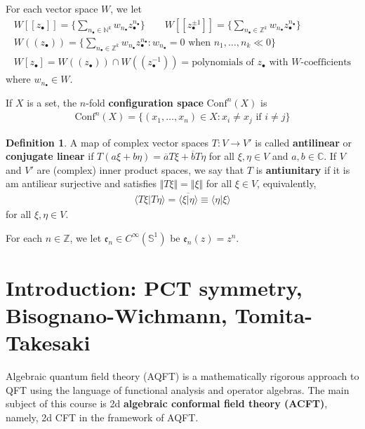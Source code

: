 \documentclass[12pt,b5paper,notitlepage]{article}
\theoremstyle{definition}
\newtheorem{df}{Definition}[section]
\theoremstyle{plain}
\newcommand{\ovl}{\overline}
\newcommand{\Conf}{\mathrm{Conf}}
\newcommand{\bk}[1]{\langle {#1}\rangle}
\newcommand{\blt}{\bullet}
\newcommand{\Cbb}{\mathbb C}
\newcommand{\Nbb}{\mathbb N}
\newcommand{\Zbb}{\mathbb Z}
\newcommand{\Sbb}{{\mathbb S}}
\newcommand{\ek}{\mathfrak{e}}
\numberwithin{equation}{section}
\begin{document}
For each vector space $W$, we let
\begin{gather*}
W[[z_\blt]]=\Big\{\sum_{n_\blt\in\Nbb^k} w_{n_\blt}z_\blt^{n_\blt} \Big\}\qquad W[[z_\blt^{\pm1}]]=\Big\{\sum_{n_\blt\in\Zbb^k} w_{n_\blt}z_\blt^{n_\blt} \Big\}\\
W((z_\blt))=\Big\{\sum_{n_\blt\in\Zbb^k} w_{n_\blt}z_\blt^{n_\blt}:w_{n_\blt}=0\text{ when }n_1,\dots,n_k\ll 0 \Big\}\\
W[z_\blt]=W((z_\blt))\cap W((z_\blt^{-1}))=\text{polynomials of $z_\blt$ with $W$-coefficients}
\end{gather*}
where $w_{n_\blt}\in W$.


If $X$ is a set, the $n$-fold \textbf{configuration space}  $\Conf^n(X)$ \index{Conf@$\Conf^n(X)$} is
\begin{align}
\Conf^n(X)=\{(x_1,\dots,x_n)\in X:x_i\neq x_j\text{ if }i\neq j\}
\end{align}

\begin{df}
A map of complex vector spaces $T:V\rightarrow V'$ is called \textbf{antilinear}  or \textbf{conjugate linear} if $T(a\xi+b\eta)=\ovl aT\xi+\ovl bT\eta$ for all $\xi,\eta\in V$ and $a,b\in\Cbb$. If $V$ and $V'$ are (complex) inner product spaces, we say that $T$ is \textbf{antiunitary}  if it is am antiliear surjective and satisfies $\Vert T\xi\Vert=\Vert\xi\Vert$ for all $\xi\in V$, equivalently,
\begin{align}\label{eq14}
\bk{T\xi|T\eta}=\ovl{\bk{\xi|\eta}}\equiv\bk{\eta|\xi}
\end{align}
for all $\xi,\eta\in V$.
\end{df}

For each $n\in\Zbb$, we let $\ek_n\in C^\infty(\Sbb^1)$ be $\ek_n(z)=z^n$.







\newpage



\section{Introduction: PCT symmetry, Bisognano-Wichmann, Tomita-Takesaki}


Algebraic quantum field theory (AQFT) is a mathematically rigorous approach to QFT using the language of functional analysis and operator algebras. The main subject of this course is 2d \textbf{algebraic conformal field theory (ACFT)}, namely, 2d CFT in the framework of AQFT.
\end{document}
